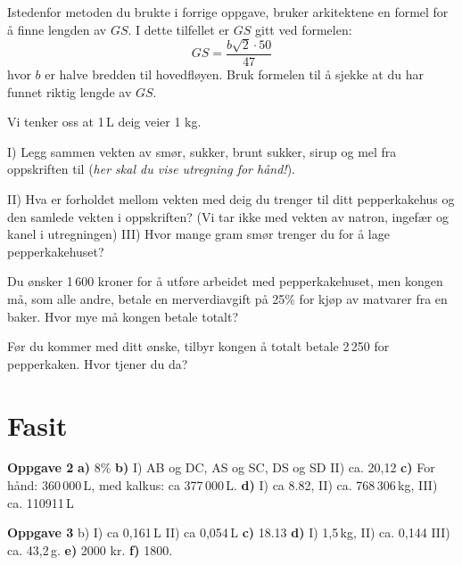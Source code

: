 \ab Istedenfor metoden du brukte i forrige oppgave, bruker arkitektene en formel for å finne lengden av $ GS $. I dette tilfellet er $ GS $ gitt ved formelen:
\[ GS = \frac{b \sqrt{2}\cdot50}{47} \]
hvor $ b $ er halve bredden til hovedfløyen.
Bruk formelen til å sjekke at du har funnet riktig lengde av $ GS $. \vsk

\ab Vi tenker oss at 1\,L deig veier 1 kg. \os

I) Legg sammen vekten av smør, sukker, brunt sukker, sirup og mel  fra oppskriften til  (\textsl{her skal du vise utregning for hånd!}).\os 

II) Hva er forholdet mellom vekten med deig du trenger til ditt pepperkakehus og den samlede vekten i oppskriften? (Vi tar ikke med vekten av natron, ingefær og kanel i utregningen)\os
III) Hvor mange gram smør trenger du for å lage pepperkakehuset?\vsk

\ab Du ønsker 1\,600 kroner for å utføre arbeidet med pepperkakehuset, men kongen må, som alle andre, betale en merverdiavgift på 25\% for kjøp av matvarer fra en baker. Hvor mye må kongen betale totalt?\vsk

\ab Før du kommer med ditt ønske, tilbyr kongen å totalt betale 2\,250 for pepperkaken. Hvor tjener du da?

\newpage
\section*{Fasit}
\small
\textbf{Oppgave 2} \os
\textbf{a)} 8\% \textbf{b)} I) AB og DC, AS og SC, DS og SD\; II) ca. 20,12 \textbf{c)} For hånd: 360\,000\,L, med kalkus:  ca 377\,000\,L.  \textbf{d)} I) ca 8.82, II) ca. 768\,306\,kg, III) ca. 110911\,L \vsk

\textbf{Oppgave 3}\os
b) I) ca 0,161\,L 
II) ca 0,054\,L
\textbf{c)} 18.13
\textbf{d)} I) 1,5\,kg, II) ca. 0,144 III) ca. 43,2\,g. 
\textbf{e)} 2000 kr. \textbf{f)} 1800.






